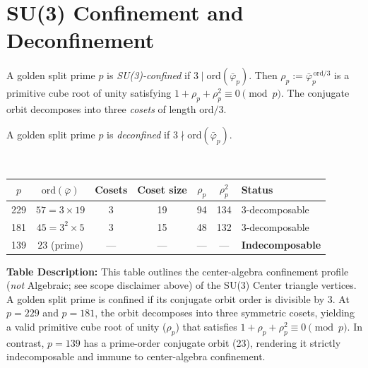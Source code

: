 \section{SU(3) Confinement and Deconfinement}
\label{sec:confinement}



\begin{definition}[SU(3) confinement]
A golden split prime $p$ is \emph{SU(3)-confined} if
$3 \mid \mathrm{ord}(\bar\varphi_p)$.
Then $\rho_p := \bar\varphi_p^{\,\mathrm{ord}/3}$
is a primitive cube root of unity satisfying
$1 + \rho_p + \rho_p^2 \equiv 0 \pmod{p}$.
The conjugate orbit decomposes into three \emph{cosets}
of length $\mathrm{ord}/3$.
\end{definition}

\begin{definition}[Deconfinement]
A golden split prime $p$ is \emph{deconfined} if
$3 \nmid \mathrm{ord}(\bar\varphi_p)$.
\end{definition}

\begin{result}
\label{res:confinement}
~
\begin{center}
\begin{tabular}{@{}ccccccl@{}}
\toprule
$p$ & $\mathrm{ord}(\bar\varphi)$ & Cosets & Coset size
    & $\rho_p$ & $\rho_p^2$ & Status \\
\midrule
229 & $57 = 3 \times 19$ & 3 & 19 & 94 & 134 & 3-decomposable \\
181 & $45 = 3^2 \times 5$ & 3 & 15 & 48 & 132 & 3-decomposable \\
139 & $23$ (prime) & --- & --- & --- & --- & \textbf{Indecomposable} \\
\bottomrule
\end{tabular}
\end{center}
\textbf{Table Description:} This table outlines the center-algebra confinement profile (\emph{not} Algebraic; see scope disclaimer above) of the SU(3) Center triangle vertices. A golden split prime is confined if its conjugate orbit order is divisible by 3. At $p=229$ and $p=181$, the orbit decomposes into three symmetric cosets, yielding a valid primitive cube root of unity ($\rho_p$) that satisfies $1 + \rho_p + \rho_p^2 \equiv 0 \pmod{p}$. In contrast, $p=139$ has a prime-order conjugate orbit (23), rendering it strictly indecomposable and immune to center-algebra confinement.
\end{result}

